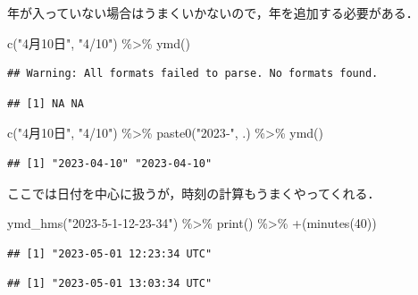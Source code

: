 \documentclass[
]{article}
\newenvironment{Shaded}{\begin{snugshade}}{\end{snugshade}}
\newcommand{\AttributeTok}[1]{\textcolor[rgb]{0.77,0.63,0.00}{#1}}
\newcommand{\DecValTok}[1]{\textcolor[rgb]{0.00,0.00,0.81}{#1}}
\newcommand{\FunctionTok}[1]{\textcolor[rgb]{0.00,0.00,0.00}{#1}}
\newcommand{\NormalTok}[1]{#1}
\newcommand{\SpecialCharTok}[1]{\textcolor[rgb]{0.00,0.00,0.00}{#1}}
\newcommand{\StringTok}[1]{\textcolor[rgb]{0.31,0.60,0.02}{#1}}
\begin{document}
年が入っていない場合はうまくいかないので，年を追加する必要がある．

\begin{Shaded}
\begin{Highlighting}[]
\FunctionTok{c}\NormalTok{(}\StringTok{"4月10日"}\NormalTok{, }\StringTok{"4/10"}\NormalTok{) }\SpecialCharTok{\%\textgreater{}\%}
  \FunctionTok{ymd}\NormalTok{()}
\end{Highlighting}
\end{Shaded}

\begin{verbatim}
## Warning: All formats failed to parse. No formats found.
\end{verbatim}

\begin{verbatim}
## [1] NA NA
\end{verbatim}

\begin{Shaded}
\begin{Highlighting}[]
\FunctionTok{c}\NormalTok{(}\StringTok{"4月10日"}\NormalTok{, }\StringTok{"4/10"}\NormalTok{) }\SpecialCharTok{\%\textgreater{}\%}
  \FunctionTok{paste0}\NormalTok{(}\StringTok{"2023{-}"}\NormalTok{, .) }\SpecialCharTok{\%\textgreater{}\%}
  \FunctionTok{ymd}\NormalTok{()}
\end{Highlighting}
\end{Shaded}

\begin{verbatim}
## [1] "2023-04-10" "2023-04-10"
\end{verbatim}

ここでは日付を中心に扱うが，時刻の計算もうまくやってくれる．

\begin{Shaded}
\begin{Highlighting}[]
\FunctionTok{ymd\_hms}\NormalTok{(}\StringTok{"2023{-}5{-}1{-}12{-}23{-}34"}\NormalTok{) }\SpecialCharTok{\%\textgreater{}\%}
  \FunctionTok{print}\NormalTok{() }\SpecialCharTok{\%\textgreater{}\%}
  \StringTok{\textasciigrave{}}\AttributeTok{+}\StringTok{\textasciigrave{}}\NormalTok{(}\FunctionTok{minutes}\NormalTok{(}\DecValTok{40}\NormalTok{))}
\end{Highlighting}
\end{Shaded}

\begin{verbatim}
## [1] "2023-05-01 12:23:34 UTC"
\end{verbatim}

\begin{verbatim}
## [1] "2023-05-01 13:03:34 UTC"
\end{verbatim}
\end{document}
